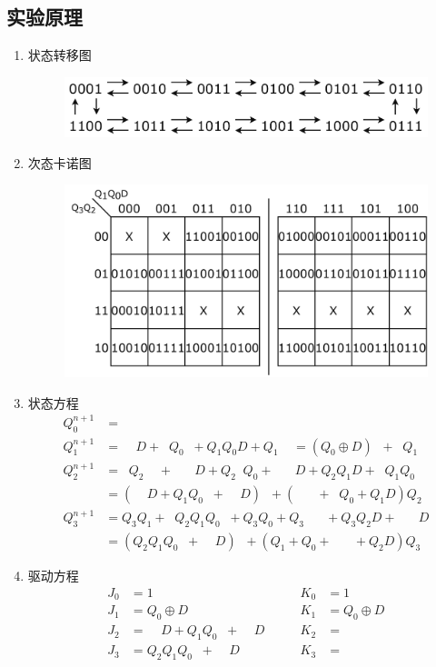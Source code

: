 \documentclass[11pt,UTF8]{ctexart}
\newcommand{\ol}[1]{\mathop{\overline{#1}}}%
\begin{document}
\subsection{实验原理}
\begin{enumerate}
    \item 状态转移图
    \begin{figure}[H]
        \centering
        \includegraphics[width=0.6\linewidth]{fig/12system_2.pdf}
    \end{figure}
    \item 次态卡诺图
    \begin{figure}[H]
        \centering
        \includegraphics[width=0.6\linewidth]{fig/Karnaugh_12system_2.pdf}
    \end{figure}
    \item 状态方程
    \[\begin{aligned}
    Q_0^{n+1} &= \ol{Q_0}\\
    Q_1^{n+1} &= \ol{Q_1}\ol{Q_0}D+\ol{Q_1}Q_0\ol{D}+Q_1Q_0D+Q_1\ol{Q_0}\ol{D}
                =(Q_0\oplus D)\ol{Q_1}+\ol{Q_0\oplus D}Q_1\\
    Q_2^{n+1} &= \ol{Q_3}Q_2\ol{Q_0}\ol{D}+\ol{Q_2}\ol{Q_1}\ol{Q_0}D+Q_2\ol{Q_1}Q_0+\ol{Q_3}\ol{Q_2}\ol{Q_1}D+Q_2Q_1D+\ol{Q_2}Q_1Q_0\ol{D}\\
    &=(\ol{Q_1}\ol{Q_0}D+Q_1Q_0\ol{D}+\ol{Q_3}\ol{Q_1}D)\ol{Q_2}+(\ol{Q_3}\ol{Q_0}\ol{D}+\ol{Q_1}Q_0+Q_1D)Q_2\\
    Q_3^{n+1} &= Q_3Q_1+\ol{Q_3}Q_2Q_1Q_0\ol{D}+Q_3Q_0+Q_3\ol{Q_2}\ol{Q_1}\ol{D}+Q_3Q_2D+\ol{Q_3}\ol{Q_2}\ol{Q_1}D\\
    &=(Q_2Q_1Q_0\ol{D}+\ol{Q_2}\ol{Q_1}D)\ol{Q_3}+(Q_1+Q_0+\ol{Q_2}\ol{Q_1}\ol{D}+Q_2D)Q_3
    \end{aligned}\]
    \item 驱动方程
    \[\begin{aligned}
    J_0&=1\qquad &K_0&=1\\
    J_1&=Q_0\oplus D \qquad &K_1&=Q_0\oplus D \\
    J_2&=\ol{Q_1}\ol{Q_0}D+Q_1Q_0\ol{D}+\ol{Q_3}\ol{Q_1}D \qquad &K_2&=\ol{\ol{Q_3}\ol{Q_0}\ol{D}+\ol{Q_1}Q_0+Q_1D} \\
    J_3&=Q_2Q_1Q_0\ol{D}+\ol{Q_2}\ol{Q_1}D \qquad &K_3&=\ol{Q_1+Q_0+\ol{Q_2}\ol{Q_1}\ol{D}+Q_2D}
    \end{aligned}\]
\end{enumerate}
\end{document}
